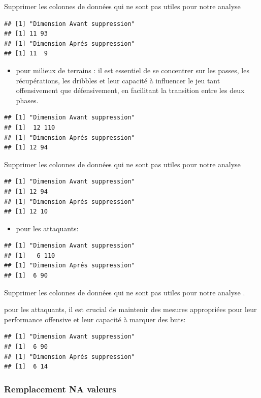 \documentclass[
  6pt,
]{article}
\providecommand{\tightlist}{%
  \setlength{\itemsep}{0pt}\setlength{\parskip}{0pt}}
\begin{document}
Supprimer les colonnes de données qui ne sont pas utiles pour notre
analyse

\begin{verbatim}
## [1] "Dimension Avant suppression"
## [1] 11 93
## [1] "Dimension Aprés suppression"
## [1] 11  9
\end{verbatim}

\begin{itemize}
\tightlist
\item
  pour milieux de terrains : il est essentiel de se concentrer sur les
  passes, les récupérations, les dribbles et leur capacité à influencer
  le jeu tant offensivement que défensivement, en facilitant la
  transition entre les deux phases.
\end{itemize}

\begin{verbatim}
## [1] "Dimension Avant suppression"
## [1]  12 110
## [1] "Dimension Aprés suppression"
## [1] 12 94
\end{verbatim}

Supprimer les colonnes de données qui ne sont pas utiles pour notre
analyse

\begin{verbatim}
## [1] "Dimension Avant suppression"
## [1] 12 94
## [1] "Dimension Aprés suppression"
## [1] 12 10
\end{verbatim}

\begin{itemize}
\tightlist
\item
  pour les attaquants:
\end{itemize}

\begin{verbatim}
## [1] "Dimension Avant suppression"
## [1]   6 110
## [1] "Dimension Aprés suppression"
## [1]  6 90
\end{verbatim}

Supprimer les colonnes de données qui ne sont pas utiles pour notre
analyse .

pour les attaquants, il est crucial de maintenir des mesures appropriées
pour leur performance offensive et leur capacité à marquer des buts:

\begin{verbatim}
## [1] "Dimension Avant suppression"
## [1]  6 90
## [1] "Dimension Aprés suppression"
## [1]  6 14
\end{verbatim}

\subsubsection{Remplacement NA valeurs}\label{remplacement-na-valeurs}
\end{document}
